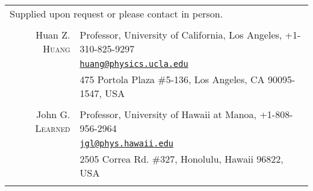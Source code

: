 \documentclass[11pt]{article} %
\begin{document}
\noindent\begin{tabular}{rp{12cm}}
\multicolumn{2}{l}{\footnotesize{Supplied upon request or please contact in
	person.}}\\
\multicolumn{2}{c}{}\\

Huan Z. \textsc{Huang} & Professor, University of California, Los Angeles, +1-310-825-9297\\
& \href{mailto:huang@physics.ucla.edu}{\nolinkurl{huang@physics.ucla.edu}}\\
& 475 Portola Plaza \#5-136, Los Angeles, CA 90095-1547, USA\\
\\
John G. \textsc{Learned} & Professor, University of Hawaii at Manoa, +1-808-956-2964\\
& \href{mailto:jgl@phys.hawaii.edu}{\nolinkurl{jgl@phys.hawaii.edu}}\\
& 2505 Correa Rd. \#327, Honolulu, Hawaii 96822, USA\\
\\


\end{tabular}
\end{document}
